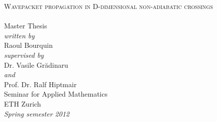 \begin{titlepage}
\begin{center}
  \hfill
  \vspace{3.0cm}

  {\huge \textsc{Wavepacket propagation in D-dimensional non-adiabatic crossings\\[10pt]
  }}
  ~\\[20pt]

  {\huge{Master Thesis}}\\[2.5cm]

  {\emph{written by}}\\
  Raoul Bourquin
  \\[0.6cm]
  {\emph{supervised by}}\\
  Dr. Vasile Gr\u{a}dinaru\\
  {\emph{and}}\\
  Prof. Dr. Ralf Hiptmair
  \\[2.5cm]

  Seminar for Applied Mathematics\\
  ETH Zurich
  \\[0.5cm]
  \emph{{Spring semester 2012}}
\end{center}
\end{titlepage}
